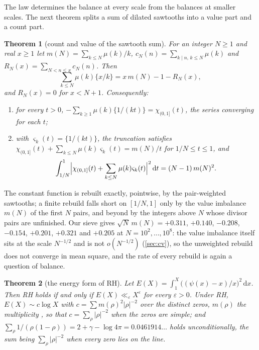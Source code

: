 \documentclass[11pt]{article}
\newtheorem{theorem}{Theorem}[section]
\theoremstyle{definition}\newtheorem{definition}[theorem]{Definition}
\theoremstyle{remark}\newtheorem{remark}[theorem]{Remark}
\newcommand{\dd}{\,\mathrm d}\newcommand{\e}{\mathrm e}
\newcommand{\fr}[1]{\{#1\}}
\begin{document}
The law determines the balance at every scale from the balances at smaller scales. The next theorem splits a sum of dilated sawtooths into a value part and a count part.

\begin{theorem}[count and value of the sawtooth sum]\label{mt:countvalue}
For an integer $N\ge1$ and real $x\ge1$ let $m(N)=\sum_{k\le N}\mu(k)/k$, $c_N(n)=\sum_{k\mid n,\,k\le N}\mu(k)$ and $R_N(x)=\sum_{N<n\le x}c_N(n)$. Then
\begin{equation}\label{eq:cv}
\sum_{k\le N}\mu(k)\fr{x/k}=x\,m(N)-1-R_N(x),
\end{equation}
and $R_N(x)=0$ for $x<N+1$. Consequently:
\begin{enumerate}[label=\textup{(\alph*)}]
\item for every $t>0$, $-\sum_{k\ge1}\mu(k)\fr{1/(kt)}=\chi_{(0,1]}(t)$, the series converging for each $t$;
\item with $\varsigma_k(t)=\fr{1/(kt)}$, the truncation satisfies $\chi_{(0,1]}(t)+\sum_{k\le N}\mu(k)\varsigma_k(t)=m(N)/t$ for $1/N\le t\le1$, and
\[
\int_{1/N}^1\Bigl|\chi_{(0,1]}(t)+\sum_{k\le N}\mu(k)\varsigma_k(t)\Bigr|^2\dd t=(N-1)\,m(N)^2 .
\]
\end{enumerate}
\end{theorem}

The constant function is rebuilt exactly, pointwise, by the pair-weighted sawtooths; a finite rebuild falls short on $[1/N,1]$ only by the value imbalance $m(N)$ of the first $N$ pairs, and beyond by the integers above $N$ whose divisor pairs are unfinished. Our sieve gives $\sqrt N\,m(N)=+0.311$, $+0.140$, $-0.208$, $-0.154$, $+0.201$, $+0.321$ and $+0.205$ at $N=10^2,\dots,10^8$: the value imbalance itself sits at the scale $N^{-1/2}$ and is not $o(N^{-1/2})$ (\cref{sec:cv}), so the unweighted rebuild does not converge in mean square, and the rate of every rebuild is again a question of balance.

\begin{theorem}[the energy form of RH]\label{mt:energy}
Let $E(X)=\int_1^X\bigl((\psi(x)-x)/x\bigr)^2\dd x$. Then RH holds if and only if $E(X)\ll_\varepsilon X^\varepsilon$ for every $\varepsilon>0$. Under RH, $E(X)\sim c\log X$ with $c=\sum m(\rho)^2|\rho|^{-2}$ over the distinct zeros, $m(\rho)$ the multiplicity \cite{Cramer}, so that $c=\sum_\rho|\rho|^{-2}$ when the zeros are simple; and $\sum_\rho1/(\rho(1-\rho))=2+\gamma-\log4\pi=0.0461914\ldots$ holds unconditionally, the sum being $\sum_\rho|\rho|^{-2}$ when every zero lies on the line.
\end{theorem}
\end{document}
